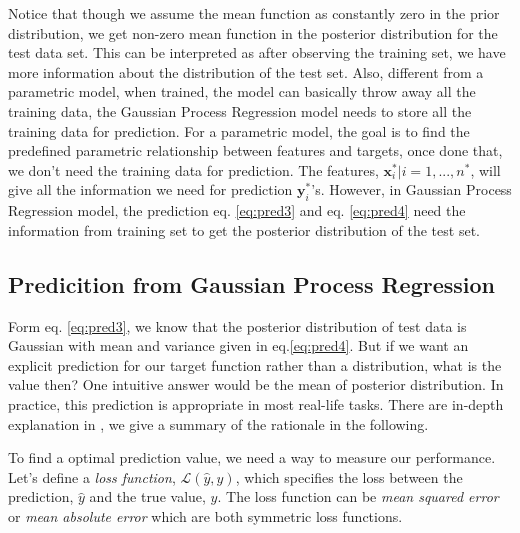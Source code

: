 \documentclass[11pt,a4paper]{article}
\theoremstyle{definition}
\numberwithin{equation}{section}
\let\vec\mathbf
\begin{document}
	Notice that though we assume the mean function as constantly zero in the prior distribution, we get non-zero mean function in the posterior distribution for the test data set. This can be interpreted as after observing the training set, we have more information about the distribution of the test set. Also, different from a parametric model, when trained, the model can basically throw away all the training data, the Gaussian Process Regression model needs to store all the training data for prediction. For a parametric model, the goal is to find the predefined parametric relationship between features and targets, once done that, we don't need the training data for prediction. The features, ${\vec x^*_i | i=1,...,n^*}$, will give all the information we need for prediction $\vec y^*_i$'s. However, in Gaussian Process Regression model, the prediction eq. \ref{eq:pred3} and eq. \ref{eq:pred4} need the information from training set to get the posterior distribution of the test set.
	
	\subsection{Predicition from Gaussian Process Regression}\label{sec:decision_theory}
	Form eq. \ref{eq:pred3}, we know that the posterior distribution of test data is Gaussian with mean and variance given in eq.\ref{eq:pred4}. But if we want an explicit prediction for our target function rather than a distribution, what is the value then? One intuitive answer would be the mean of posterior distribution. In practice, this prediction is appropriate in most real-life tasks. There are in-depth explanation in \cite[Rasmussen and Williams, sec 2.4]{RandW}, we give a summary of the rationale in the following.
	
	To find a optimal prediction value, we need a way to measure our performance. Let's define a \textit{loss function}, $\mathcal{L}(\hat y,y)$, which specifies the loss between the prediction, $\hat y$ and the true value, $y$. The loss function can be \textit{mean squared error} or \textit{mean absolute error} which are both symmetric loss functions.
	
\end{document}

